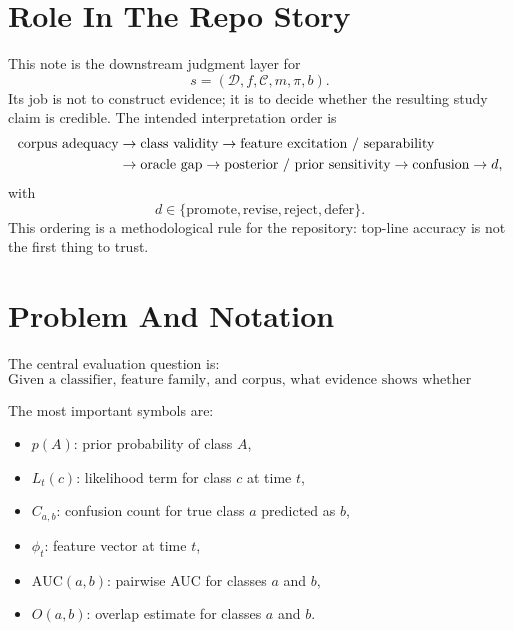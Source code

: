 \documentclass[11pt]{article}
\begin{document}
\section{Role In The Repo Story}

This note is the downstream judgment layer for
\begin{equation}
s = (\mathcal{D}, f, \mathcal{C}, m, \pi, b).
\end{equation}
Its job is not to construct evidence; it is to decide whether the resulting
study claim is credible. The intended interpretation order is
\begin{align}
\text{corpus adequacy}
&\rightarrow
\text{class validity}
\rightarrow
\text{feature excitation / separability}
\notag \\
&\rightarrow
\text{oracle gap}
\rightarrow
\text{posterior / prior sensitivity}
\rightarrow
\text{confusion}
\rightarrow
d,
\end{align}
with
\begin{equation}
d \in \{\text{promote}, \text{revise}, \text{reject}, \text{defer}\}.
\end{equation}
This ordering is a methodological rule for the repository: top-line accuracy is
not the first thing to trust.

\section{Problem And Notation}

The central evaluation question is:
\begin{equation}
    \text{Given a classifier, feature family, and corpus, what evidence shows whether apparent success or failure is real?}
\end{equation}

The most important symbols are:
\begin{itemize}[leftmargin=1.5em]
    \item \(p(A)\): prior probability of class \(A\),
    \item \(L_t(c)\): likelihood term for class \(c\) at time \(t\),
    \item \(C_{a,b}\): confusion count for true class \(a\) predicted as \(b\),
    \item \(\phi_t\): feature vector at time \(t\),
    \item \(\mathrm{AUC}(a,b)\): pairwise AUC for classes \(a\) and \(b\),
    \item \(O(a,b)\): overlap estimate for classes \(a\) and \(b\).
\end{itemize}
\end{document}
